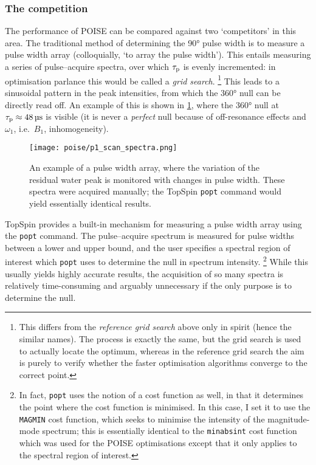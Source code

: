 \subsubsection{The competition}

The performance of POISE can be compared against two `competitors' in this area.
The traditional method of determining the \ang{90} pulse width is to measure a pulse width array (colloquially, `to array the pulse width').\autocite{Keifer1999CMR}
This entails measuring a series of pulse--acquire spectra, over which $\tau_\mathrm{p}$ is evenly incremented: in optimisation parlance this would be called a \textit{grid search}.%
\footnote{This differs from the \textit{reference grid search} above only in spirit (hence the similar names). The process is exactly the same, but the grid search is used to actually locate the optimum, whereas in the reference grid search the aim is purely to verify whether the faster optimisation algorithms converge to the correct point.}
This leads to a sinusoidal pattern in the peak intensities, from which the \ang{360} null can be directly read off.
An example of this is shown in \cref{fig:p1_scan_spectra}, where the \ang{360} null at $\taup \approx \qty{48}{\us}$ is visible (it is never a \textit{perfect} null because of off-resonance effects and $\omega_1$, i.e.\ $B_1$, inhomogeneity).

\begin{figure}[htb]
    \centering
    \texttt{[image: poise/p1\_scan\_spectra.png]}%
    \caption[Pulse width array]{
        An example of a pulse width array, where the variation of the residual water peak is monitored with changes in pulse width.
        These spectra were acquired manually; the TopSpin \texttt{popt} command would yield essentially identical results.
    }
    \label{fig:p1_scan_spectra}
\end{figure}

TopSpin provides a built-in mechanism for measuring a pulse width array using the \texttt{popt} command.
The pulse--acquire spectrum is measured for pulse widths between a lower and upper bound, and the user specifies a spectral region of interest which \texttt{popt} uses to determine the null in spectrum intensity.%
\footnote{In fact, \texttt{popt} uses the notion of a cost function as well, in that it determines the point where the cost function is minimised. In this case, I set it to use the \texttt{MAGMIN} cost function, which seeks to minimise the intensity of the magnitude-mode spectrum; this is essentially identical to the \texttt{minabsint} cost function which was used for the POISE optimisations except that it only applies to the spectral region of interest.}
While this usually yields highly accurate results, the acquisition of so many spectra is relatively time-consuming and arguably unnecessary if the only purpose is to determine the null.


